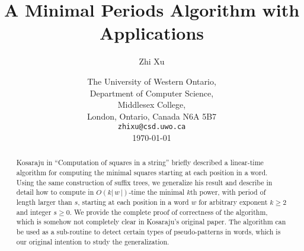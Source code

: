 \documentclass{article}
\title{A Minimal Periods Algorithm with Applications}
\author{Zhi Xu}
\date{The University of Western Ontario, \\
Department of Computer Science, \\
Middlesex College, \\
London, Ontario, Canada N6A 5B7 \\
{\tt zhi\us xu@csd.uwo.ca} \\
\medskip
\today}
\def\abs#1{{|\,#1\,|}}
\begin{document}
\maketitle


\begin{abstract}
Kosaraju in ``Computation of squares in a string'' briefly described a
linear-time algorithm for computing the minimal squares starting at
each position in a word. Using the same construction of suffix
trees, we generalize his result and describe in detail how to
compute in $O(k\abs{w})$-time the minimal $k$th power, with period
of length larger than $s$, starting at each position in a word $w$
for arbitrary exponent $k\geq2$ and integer $s\geq0$. We provide the
complete proof of correctness of the algorithm, which is somehow not
completely clear in Kosaraju's original paper. The algorithm can be
used as a sub-routine to detect certain types of pseudo-patterns in
words, which is our original intention to study the generalization.
\end{abstract}
\end{document}
